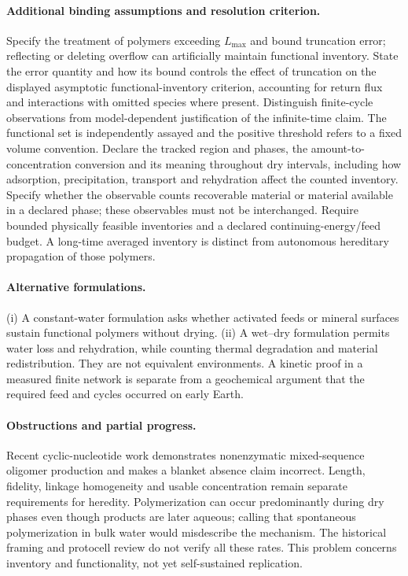 \documentclass[11pt]{article}
\begin{document}
\paragraph{Additional binding assumptions and resolution criterion.} Specify the treatment of polymers exceeding $L_{\max}$ and bound truncation error; reflecting or deleting overflow can artificially maintain functional inventory. State the error quantity and how its bound controls the effect of truncation on the displayed asymptotic functional-inventory criterion, accounting for return flux and interactions with omitted species where present. Distinguish finite-cycle observations from model-dependent justification of the infinite-time claim. The functional set is independently assayed and the positive threshold refers to a fixed volume convention. Declare the tracked region and phases, the amount-to-concentration conversion and its meaning throughout dry intervals, including how adsorption, precipitation, transport and rehydration affect the counted inventory. Specify whether the observable counts recoverable material or material available in a declared phase; these observables must not be interchanged. Require bounded physically feasible inventories and a declared continuing-energy/feed budget. A long-time averaged inventory is distinct from autonomous hereditary propagation of those polymers.

\paragraph{Alternative formulations.} (i) A constant-water formulation asks whether activated feeds or mineral surfaces sustain functional polymers without drying. (ii) A wet--dry formulation permits water loss and rehydration, while counting thermal degradation and material redistribution. They are not equivalent environments. A kinetic proof in a measured finite network is separate from a geochemical argument that the required feed and cycles occurred on early Earth.

\paragraph{Obstructions and partial progress.} Recent cyclic-nucleotide work demonstrates nonenzymatic mixed-sequence oligomer production and makes a blanket absence claim incorrect. Length, fidelity, linkage homogeneity and usable concentration remain separate requirements for heredity. Polymerization can occur predominantly during dry phases even though products are later aqueous; calling that spontaneous polymerization in bulk water would misdescribe the mechanism. The historical framing and protocell review do not verify all these rates. This problem concerns inventory and functionality, not yet self-sustained replication.
\end{document}
